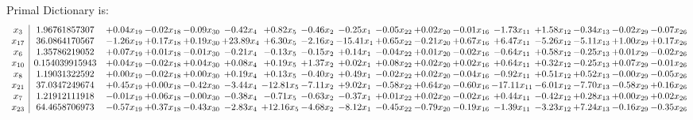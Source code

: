 \documentclass[9pt]{article}
\begin{document}
Primal Dictionary is:
\[\begin{array}{c| c c@{\hskip 2pt} c@{\hskip 2pt} c@{\hskip 2pt} c@{\hskip 2pt} c@{\hskip 2pt} c@{\hskip 2pt} c@{\hskip 2pt} c@{\hskip 2pt} c@{\hskip 2pt} c@{\hskip 2pt} c@{\hskip 2pt} c@{\hskip 2pt} c@{\hskip 2pt} c@{\hskip 2pt} c@{\hskip 2pt} }
 x_{3}   &  1.96761857307 & +  0.04 x_{19} & -0.02 x_{18} & -0.09 x_{30} & -0.42 x_{4} & +  0.82 x_{5} & -0.46 x_{2} & -0.25 x_{1} & -0.05 x_{22} & +  0.02 x_{20} & -0.01 x_{16} & -1.73 x_{11} & +  1.58 x_{12} & -0.34 x_{13} & -0.02 x_{29} & -0.07 x_{26}\\
 x_{17}   &  36.0864170567 & -1.26 x_{19} & +  0.17 x_{18} & +  0.19 x_{30} & + 23.89 x_{4} & +  6.30 x_{5} & -2.16 x_{2} & -15.41 x_{1} & +  0.65 x_{22} & -0.21 x_{20} & +  0.67 x_{16} & +  6.47 x_{11} & -5.26 x_{12} & -5.11 x_{13} & +  1.00 x_{29} & +  0.17 x_{26}\\
 x_{6}   &  1.35786219052 & +  0.07 x_{19} & +  0.01 x_{18} & -0.01 x_{30} & -0.21 x_{4} & -0.13 x_{5} & -0.15 x_{2} & +  0.14 x_{1} & -0.04 x_{22} & +  0.01 x_{20} & -0.02 x_{16} & -0.64 x_{11} & +  0.58 x_{12} & -0.25 x_{13} & +  0.01 x_{29} & -0.02 x_{26}\\
 x_{10}   &  0.154039915943 & +  0.04 x_{19} & -0.02 x_{18} & +  0.04 x_{30} & +  0.08 x_{4} & +  0.19 x_{5} & +  1.37 x_{2} & +  0.02 x_{1} & +  0.08 x_{22} & +  0.02 x_{20} & +  0.02 x_{16} & +  0.64 x_{11} & +  0.32 x_{12} & -0.25 x_{13} & +  0.07 x_{29} & -0.01 x_{26}\\
 x_{8}   &  1.19031322592 & +  0.00 x_{19} & -0.02 x_{18} & +  0.00 x_{30} & +  0.19 x_{4} & +  0.13 x_{5} & -0.40 x_{2} & +  0.49 x_{1} & -0.02 x_{22} & +  0.02 x_{20} & -0.04 x_{16} & -0.92 x_{11} & +  0.51 x_{12} & +  0.52 x_{13} & -0.00 x_{29} & -0.05 x_{26}\\
 x_{21}   &  37.0347249674 & +  0.45 x_{19} & +  0.00 x_{18} & -0.42 x_{30} & -3.44 x_{4} & -12.81 x_{5} & -7.11 x_{2} & +  9.02 x_{1} & -0.58 x_{22} & +  0.64 x_{20} & -0.60 x_{16} & -17.11 x_{11} & -6.01 x_{12} & -7.70 x_{13} & -0.58 x_{29} & +  0.16 x_{26}\\
 x_{7}   &  1.21912111918 & -0.01 x_{19} & +  0.06 x_{18} & -0.00 x_{30} & -0.38 x_{4} & -0.71 x_{5} & -0.63 x_{2} & -0.37 x_{1} & +  0.01 x_{22} & +  0.02 x_{20} & -0.02 x_{16} & +  0.44 x_{11} & -0.42 x_{12} & +  0.28 x_{13} & +  0.00 x_{29} & +  0.02 x_{26}\\
 x_{23}   &  64.4658706973 & -0.57 x_{19} & +  0.37 x_{18} & -0.43 x_{30} & -2.83 x_{4} & + 12.16 x_{5} & -4.68 x_{2} & -8.12 x_{1} & -0.45 x_{22} & -0.79 x_{20} & -0.19 x_{16} & -1.39 x_{11} & -3.23 x_{12} & +  7.24 x_{13} & -0.16 x_{29} & -0.35 x_{26}\\

\end{array}\]
\end{document}
